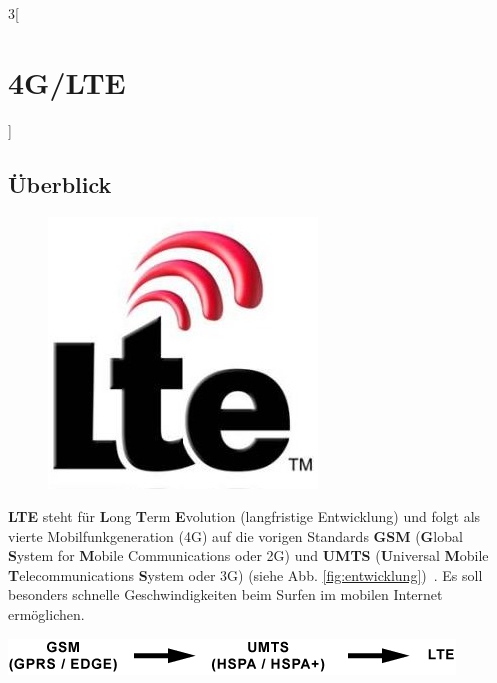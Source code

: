\begin{multicols}{3}[\section{4G/LTE}]
\subsection*{Überblick}
\begin{figure}
  \vspace{-20pt}
  \begin{center}
  	\hspace{-20pt}
    \includegraphics[width=0.7\linewidth]{Kapitel/4GLTE/Grafiken/LTE-Logo.jpg}
  \end{center}
  \vspace{-15pt}
\end{figure}
\textbf{LTE} steht für \textbf{L}ong \textbf{T}erm \textbf{E}volution (langfristige Entwicklung) und folgt als vierte Mobilfunkgeneration (4G) auf die vorigen Standards \textbf{GSM} (\textbf{G}lobal \textbf{S}ystem for \textbf{M}obile Communications oder 2G) und \textbf{UMTS} (\textbf{U}niversal \textbf{M}obile \textbf{T}elecommunications \textbf{S}ystem oder 3G) (siehe Abb. \ref{fig:entwicklung})~\cite{4GLTE.1}. 
Es soll besonders schnelle Geschwindigkeiten beim Surfen im mobilen Internet ermöglichen. 

\begin{Figure}
\includegraphics[width=\linewidth]{Kapitel/4GLTE/Grafiken/13010511.png}
\label{fig:entwicklung}
\end{Figure}


\end{multicols}
